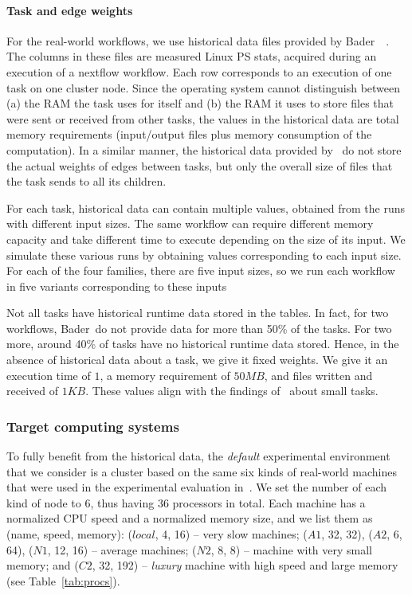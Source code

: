 \documentclass[conference]{IEEEtran}
\newcommand{\skug}[1]{{\color{blue}[SK: #1]}}
\begin{document}
    \paragraph{Task and edge weights}
    For the real-world workflows, we use historical data files provided by Bader~\etal~\cite{lotaru}.
    The columns in these files are measured Linux PS stats, acquired during an execution of a nextflow workflow.
    Each row corresponds to an execution of one task on one cluster node.
    Since the operating system cannot distinguish between (a) the RAM the task uses for itself and (b) the RAM it uses
    to store files that were sent or received from other tasks, the values in the historical data are total memory requirements (input/output files plus memory consumption of the computation).
    In a similar manner, the historical data provided by~\cite{lotaru} do not store the actual weights of edges between tasks, but only the overall
    size of files that the task sends to all its children.

    For each task, historical data can contain multiple values, obtained from the runs with different input sizes.
    The same workflow can require different memory capacity and take different time to execute
    depending on the size of its input.
    We simulate these various runs by obtaining values corresponding to each input size.
    For each of the four families, there are five input sizes, so we run each workflow in five variants corresponding to these inputs

    Not all tasks have historical runtime data stored in the tables.
    In fact, for two workflows, Bader~\etal do not provide data for more than 50\% of the tasks.
    For two more, around 40\% of tasks have no historical runtime data stored.
    Hence, in the absence of historical data about a task, we give it fixed weights.
    We give it an execution time of $1$, a memory requirement of $50 MB$, and files written and received of $1KB$.
    These values align with the findings of~\cite{lotaru} about small tasks.
%

    \subsubsection{Target computing systems}

    To fully benefit from the historical data, the  {\em default} experimental environment
    that we consider is a cluster based on the same six
    kinds of real-world machines that were used in the experimental evaluation in~\cite{lotaru}.
    We set the number of each kind of node to $6$, thus having 36 processors in total.  %
%
    Each machine has a normalized CPU speed and a normalized memory size, and we list them as (name, speed, memory):
    ($local$, 4, 16) -- very slow machines; ($A1$, 32, 32), ($A2$, 6, 64), ($N1$, 12, 16) -- average machines;
    ($N2$, 8, 8) -- machine with very small memory; and ($C2$, 32, 192) -- {\em luxury} machine with high speed and
    large memory (see Table~\ref{tab:procs}).
\end{document}
